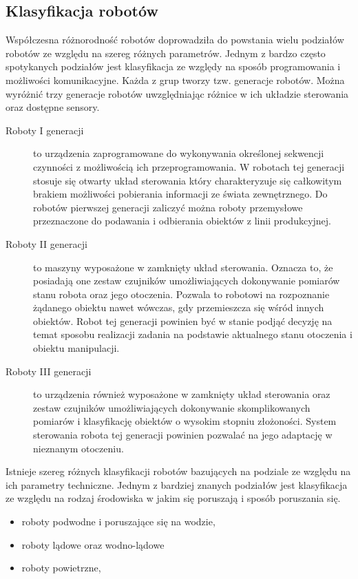 \subsection{Klasyfikacja robotów}
Współczesna różnorodność robotów doprowadziła do powstania wielu podziałów
robotów ze względu na szereg różnych parametrów. Jednym z bardzo często
spotykanych podziałów jest klasyfikacja ze względy na sposób programowania i
możliwości komunikacyjne. Każda z grup tworzy tzw. generacje robotów. Można
wyróżnić trzy generacje robotów uwzględniając różnice w ich układzie sterowania
oraz dostępne sensory\cite{website:robotyka-pl}.
\begin{description}
\item[Roboty I generacji] to urządzenia zaprogramowane do wykonywania określonej
sekwencji czynności z możliwością ich przeprogramowania. W robotach tej
generacji stosuje się otwarty układ sterowania który charakteryzuje się
całkowitym brakiem możliwości pobierania informacji ze świata zewnętrznego. Do
robotów pierwszej generacji zaliczyć można roboty przemysłowe przeznaczone do
podawania i odbierania obiektów z linii produkcyjnej.
\item[Roboty II generacji] to maszyny wyposażone w zamknięty układ sterowania.
Oznacza to, że posiadają one zestaw czujników umożliwiających dokonywanie
pomiarów stanu robota oraz jego otoczenia. Pozwala to robotowi na rozpoznanie
żądanego obiektu nawet wówczas, gdy przemieszcza się wśród innych obiektów.
Robot tej generacji powinien być w stanie podjąć decyzję na temat sposobu
realizacji zadania na podstawie aktualnego stanu otoczenia i obiektu
manipulacji.
\item[Roboty III generacji] to urządzenia również wyposażone w zamknięty układ
sterowania oraz zestaw czujników umożliwiających dokonywanie skomplikowanych
pomiarów i klasyfikację obiektów o wysokim stopniu złożoności. System sterowania
robota tej generacji powinien pozwalać na jego adaptację w nieznanym otoczeniu.
\end{description}
Istnieje szereg różnych klasyfikacji robotów bazujących na podziale ze względu
na ich parametry techniczne. Jednym z bardziej znanych podziałów jest
klasyfikacja ze względu na rodzaj środowiska w jakim się poruszają i sposób
poruszania się.
\begin{itemize}
  \item roboty podwodne i poruszające się na wodzie,
  \item roboty lądowe oraz wodno-lądowe
  \item roboty powietrzne,
\end{itemize}
